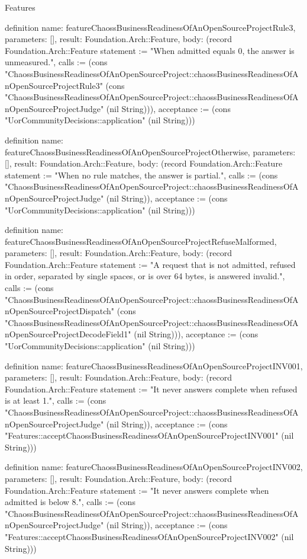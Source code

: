 \begin{lexlean}{Features}
\begin{semanticmodule}
definition{
  name: featureChaossBusinessReadinessOfAnOpenSourceProjectRule3,
  parameters: [],
  result: Foundation.Arch::Feature,
  body: (record Foundation.Arch::Feature {statement := "When admitted equals 0, the answer is unmeasured.", calls := (cons "ChaossBusinessReadinessOfAnOpenSourceProject::chaossBusinessReadinessOfAnOpenSourceProjectRule3" (cons "ChaossBusinessReadinessOfAnOpenSourceProject::chaossBusinessReadinessOfAnOpenSourceProjectJudge" (nil String))), acceptance := (cons "UorCommunityDecisions::application" (nil String))})
}

definition{
  name: featureChaossBusinessReadinessOfAnOpenSourceProjectOtherwise,
  parameters: [],
  result: Foundation.Arch::Feature,
  body: (record Foundation.Arch::Feature {statement := "When no rule matches, the answer is partial.", calls := (cons "ChaossBusinessReadinessOfAnOpenSourceProject::chaossBusinessReadinessOfAnOpenSourceProjectJudge" (nil String)), acceptance := (cons "UorCommunityDecisions::application" (nil String))})
}

definition{
  name: featureChaossBusinessReadinessOfAnOpenSourceProjectRefuseMalformed,
  parameters: [],
  result: Foundation.Arch::Feature,
  body: (record Foundation.Arch::Feature {statement := "A request that is not admitted, refused in order, separated by single spaces, or is over 64 bytes, is answered invalid.", calls := (cons "ChaossBusinessReadinessOfAnOpenSourceProject::chaossBusinessReadinessOfAnOpenSourceProjectDispatch" (cons "ChaossBusinessReadinessOfAnOpenSourceProject::chaossBusinessReadinessOfAnOpenSourceProjectDecodeField1" (nil String))), acceptance := (cons "UorCommunityDecisions::application" (nil String))})
}

definition{
  name: featureChaossBusinessReadinessOfAnOpenSourceProjectINV001,
  parameters: [],
  result: Foundation.Arch::Feature,
  body: (record Foundation.Arch::Feature {statement := "It never answers complete when refused is at least 1.", calls := (cons "ChaossBusinessReadinessOfAnOpenSourceProject::chaossBusinessReadinessOfAnOpenSourceProjectJudge" (nil String)), acceptance := (cons "Features::acceptChaossBusinessReadinessOfAnOpenSourceProjectINV001" (nil String))})
}

definition{
  name: featureChaossBusinessReadinessOfAnOpenSourceProjectINV002,
  parameters: [],
  result: Foundation.Arch::Feature,
  body: (record Foundation.Arch::Feature {statement := "It never answers complete when admitted is below 8.", calls := (cons "ChaossBusinessReadinessOfAnOpenSourceProject::chaossBusinessReadinessOfAnOpenSourceProjectJudge" (nil String)), acceptance := (cons "Features::acceptChaossBusinessReadinessOfAnOpenSourceProjectINV002" (nil String))})
}


\end{semanticmodule}
\end{lexlean}

